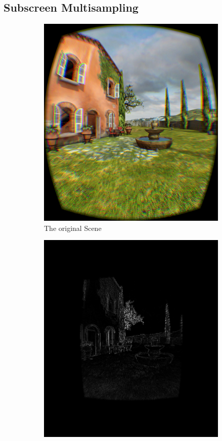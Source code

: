 \documentclass[12pt,a4paper,twoside,openright]{report}
\begin{document}
\clearpage

\subsection{Subscreen Multisampling}

\begin{figure}[tbh]

\begin{subfigure}{0.5\textwidth}
\includegraphics[width=0.9\linewidth]{figs/noantialiasing.png}
\caption{The original Scene}
\label{fig:subim2}
\end{subfigure}
\begin{subfigure}{0.5\textwidth}
\includegraphics[width=0.9\linewidth]{figs/fullscreenminussubscreenmsaa.png} 

\end{subfigure}
\end{figure}
\end{document}
